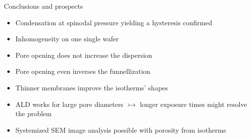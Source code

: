 \documentclass[../defence.tex]{subfiles}
\begin{document}
  \begin{frame}{Conclusions and prospects}
    \begin{tiny}
      \begin{itemize}
        \item Condensation at spinodal pressure yielding a hysteresis confirmed
        \pause
        \item Inhomogeneity on one single wafer
        \pause
        \item Pore opening does not increase the dispersion
        \pause
        \item Pore opening even inverses the funnellization
        \pause
        \item Thinner membranes improve the isotherms' shapes
        \pause
        \item ALD works for large pore diameters $\rightarrowtail$ longer exposure times might resolve the problem
        \pause
        \item Systemized SEM image analysis possible with porosity from isotherms
      \end{itemize}
    \end{tiny}
  \end{frame}
\end{document}
